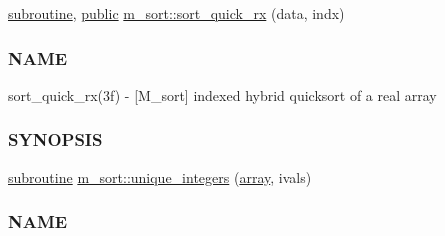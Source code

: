 \begin{DoxyCompactItemize}
\item 
\hyperlink{M__stopwatch_83_8txt_acfbcff50169d691ff02d4a123ed70482}{subroutine}, \hyperlink{M__stopwatch_83_8txt_a2f74811300c361e53b430611a7d1769f}{public} \hyperlink{namespacem__sort_a13105ae08ca3cdf4a15b49d8159162bd}{m\+\_\+sort\+::sort\+\_\+quick\+\_\+rx} (data, indx)
\begin{DoxyCompactList}\small\item\em \subsubsection*{N\+A\+ME}

sort\+\_\+quick\+\_\+rx(3f) -\/ \mbox{[}M\+\_\+sort\mbox{]} indexed hybrid quicksort of a real array \subsubsection*{S\+Y\+N\+O\+P\+S\+IS}\end{DoxyCompactList}\item 
\hyperlink{M__stopwatch_83_8txt_acfbcff50169d691ff02d4a123ed70482}{subroutine} \hyperlink{namespacem__sort_a113ddc12a316776498b8c1e85a345e12}{m\+\_\+sort\+::unique\+\_\+integers} (\hyperlink{intro__blas1_83_8txt_a89db1945e1a335ab0184c6a097821e32}{array}, ivals)
\begin{DoxyCompactList}\small\item\em \subsubsection*{N\+A\+ME}


\end{DoxyCompactList}
\end{DoxyCompactItemize}

